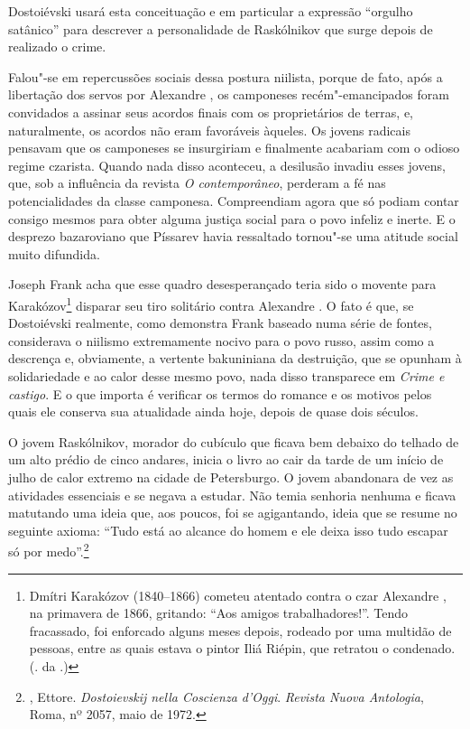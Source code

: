 Dostoiévski usará esta conceituação e em particular a expressão
``orgulho satânico'' para descrever a personalidade de Raskólnikov que
surge depois de realizado o crime.

Falou"-se em repercussões sociais dessa postura niilista, porque de fato,
após a libertação dos servos por Alexandre , os camponeses
recém"-emancipados foram convidados a assinar seus acordos finais com os
proprietários de terras, e, naturalmente, os acordos não eram favoráveis
àqueles. Os jovens radicais pensavam que os camponeses se insurgiriam e
finalmente acabariam com o odioso regime czarista. Quando nada disso
aconteceu, a desilusão invadiu esses jovens, que, sob a influência da
revista \emph{O contemporâneo}, perderam a fé nas potencialidades da
classe camponesa. Compreendiam agora que só podiam contar consigo mesmos
para obter alguma justiça social para o povo infeliz e inerte. E o
desprezo bazaroviano que Píssarev havia ressaltado tornou"-se uma atitude
social muito difundida.

Joseph Frank acha que esse quadro desesperançado teria sido o movente
para Karakózov\footnote{Dmítri Karakózov (1840--1866) cometeu atentado
  contra o czar Alexandre , na primavera de 1866, gritando: ``Aos amigos
  trabalhadores!''. Tendo fracassado, foi enforcado alguns meses depois,
  rodeado por uma multidão de pessoas, entre as quais estava o pintor
  Iliá Riépin, que retratou o condenado. (. da .)} disparar seu tiro
solitário contra Alexandre . O fato é que, se Dostoiévski realmente,
como demonstra Frank baseado numa série de fontes, considerava o
niilismo extremamente nocivo para o povo russo, assim como a descrença
e, obviamente, a vertente bakuniniana da destruição, que se opunham à
solidariedade e ao calor desse mesmo povo, nada disso transparece em
\emph{Crime e castigo}. E o que importa é verificar os termos do romance
e os motivos pelos quais ele conserva sua atualidade ainda hoje, depois
de quase dois séculos.

O jovem Raskólnikov, morador do cubículo que ficava bem debaixo do
telhado de um alto prédio de cinco andares, inicia o livro ao cair da
tarde de um início de julho de calor extremo na cidade de Petersburgo. O
jovem abandonara de vez as atividades essenciais e se negava a estudar.
Não temia senhoria nenhuma e ficava matutando uma ideia que, aos poucos,
foi se agigantando, ideia que se resume no seguinte axioma: ``Tudo está
ao alcance do homem e ele deixa isso tudo escapar só por
medo''.\footnote{, Ettore. \emph{Dostoievskij nella Coscienza
  d'Oggi}. \emph{Revista Nuova Antologia}, Roma, nº 2057, maio de 1972.}

